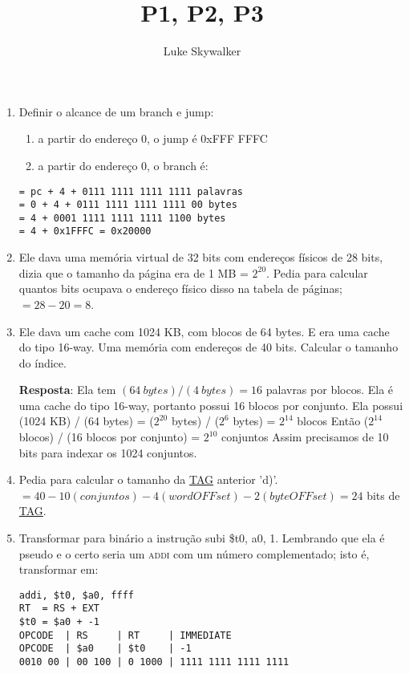 \documentclass{article}
\author{Luke Skywalker}
\title{P1, P2, P3}
\begin{document}
\maketitle

\begin{enumerate}
\item Definir o alcance de um branch e jump:

\begin{enumerate}
\item a partir do endereço 0, o jump é 0xFFF FFFC
\item a partir do endereço 0, o branch é:
\end{enumerate}

\begin{verbatim}
= pc + 4 + 0111 1111 1111 1111 palavras
= 0 + 4 + 0111 1111 1111 1111 00 bytes
= 4 + 0001 1111 1111 1111 1100 bytes
= 4 + 0x1FFFC = 0x20000
\end{verbatim}

\item Ele dava uma memória virtual de 32 bits com endereços físicos de 28 bits,
dizia que o tamanho da página era de 1 MB = $2^{20}$. Pedia para calcular
quantos bits ocupava o endereço físico disso na tabela de páginas; $= 28 - 20 =
8$.

\item Ele dava um cache com 1024 KB, com blocos de 64 bytes. E era uma cache do
tipo 16-way. Uma memória com endereços de 40 bits. Calcular o tamanho do índice.

\textbf{Resposta}: Ela tem $(64\ bytes) / (4\ bytes ) = 16$ palavras por blocos.
Ela é uma cache do tipo 16-way, portanto possui 16 blocos por conjunto. Ela
possui (1024 KB) / (64 bytes) = ($2^{20}$ bytes) / ($2^{6}$ bytes) = $2^{14}$
blocos Então ($2^{14}$ blocos) / (16 blocos por conjunto) = $2^{10}$ conjuntos
Assim precisamos de 10 bits para indexar os 1024 conjuntos.

\item Pedia para calcular o tamanho da \underline{TAG} anterior 'd)'. $= 40  -
10(conjuntos) - 4(wordOFFset) - 2(byteOFFset) = 24$ bits de \underline{TAG}.

\item Transformar para binário a instrução subi \$t0, a0, 1. Lembrando que ela é
pseudo e o certo seria um \textsc{addi} com um número complementado; isto é,
transformar em:

\begin{verbatim}
addi, $t0, $a0, ffff
RT  = RS + EXT
$t0 = $a0 + -1
OPCODE  | RS     | RT     | IMMEDIATE
OPCODE  | $a0    | $t0    | -1
0010 00 | 00 100 | 0 1000 | 1111 1111 1111 1111
\end{verbatim}


\end{enumerate}
\end{document}
